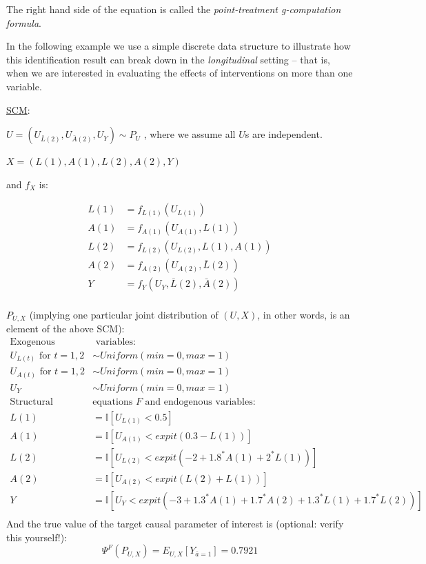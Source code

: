 \documentclass{exam}
\begin{document}
\vspace{-4mm}
\noindent The right hand side of the equation is called the \textit{point-treatment g-computation formula}. 
\vspace{3mm}

In the following example we use a simple discrete data structure to illustrate how this identification result can break down in the \textit{longitudinal} setting -- that is, when we are interested in evaluating the effects of interventions on more than one variable. 


\noindent\underline{SCM}:

$U=(U_{\bar{L}(2)}, U_{\bar{A}(2)}, U_Y) \sim P_U$ , where we assume all $U$s are independent. 

$X=(L(1), A(1), L(2), A(2), Y)$ 

and $f_X$ is:

\begin{align*}
L(1)&=f_{L(1)}(U_{L(1)}) \\
A(1)&=f_{A(1)}(U_{A(1)}, L(1)) \\
L(2)&=f_{L(2)}(U_{L(2)}, L(1), A(1)) \\
A(2)&=f_{A(2)}(U_{A(2)}, \bar{L}(2)) \\
Y&=f_{Y}(U_{Y}, \bar{L}(2), \bar{A}(2))\\
\end{align*}

\noindent \underline{$P_{U,X}$} (implying one particular joint distribution of $(U, X)$, in other words, is an element of the above SCM):
\begin{align*}
\text{Exogenous} & \text{ variables:} \\
U_{L(t)} \text{ for } t = 1,2 & \sim Uniform(min=0, max=1) \\
U_{A(t)} \text{ for } t = 1,2 &\sim Uniform(min=0, max=1) \\
U_{Y} &\sim Uniform(min=0, max=1) \\
\text{Structural } & \text{equations $F$ and endogenous variables:}  \\
L(1)& = \mathbb{I}[U_{L(1)}<0.5] \\
A(1)& = \mathbb{I}[U_{A(1)}<expit(0.3-L(1))]\\
L(2)& = \mathbb{I}[U_{L(2)}<expit(-2+1.8^*A(1)+2^*L(1))] \\
A(2)& = \mathbb{I}[U_{A(2)}<expit(L(2)+L(1))] \\
Y& = \mathbb{I}[U_{Y}<expit(-3+1.3^*A(1)+1.7^*A(2)+1.3^*L(1)+1.7^*L(2))]\\
\end{align*}
And the true value of the target causal parameter of interest is (optional: verify this yourself!):
\[
\Psi^F(P_{U,X}) = E_{U,X}[Y_{\bar{a}=1}] = 0.7921
\]
\end{document}
